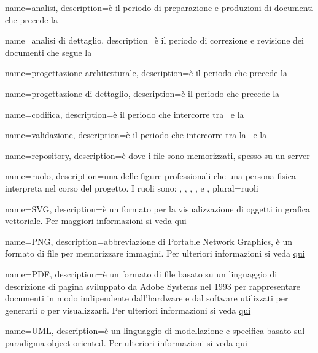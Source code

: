  {
	name=analisi,
	description={è il periodo di preparazione e produzioni di documenti che precede la \RR}
}

 {
	name=analisi di dettaglio,
	description={è il periodo di correzione e revisione dei documenti che segue la \RR{}}
}

 {
	name=progettazione architetturale,
	description={è il periodo che precede la \RP}
}

 {
	name=progettazione di dettaglio,
	description={è il periodo che precede la \RP}
}

 {
	name=codifica,
	description={è il periodo che intercorre tra \RP\ e la \RQ}
}

 {
	name=validazione,
	description={è il periodo che intercorre tra la \RQ\ e la \RA}
}

 {
	name=repository,
	description={è dove i file sono memorizzati, spesso su un server}
}

 {
	name=ruolo,
	description={una delle figure professionali che una persona fisica interpreta nel corso del progetto. I ruoli sono: , , , ,  e },
    plural=ruoli
}

 {
	name=SVG,
	description={è un formato per la visualizzazione di oggetti in grafica vettoriale. Per maggiori informazioni si veda \href{https://it.wikipedia.org/wiki/Scalable_Vector_Graphics}{qui}}
}

 {
	name=PNG,
	description={abbreviazione di Portable Network Graphics, è un formato di file per memorizzare immagini. Per ulteriori informazioni si veda \href{http://it.wikipedia.org/wiki/Portable_Network_Graphics}{qui}}
}

 {
	name=PDF,
	description={è un formato di file basato su un linguaggio di descrizione di pagina sviluppato da Adobe Systems nel 1993 per rappresentare documenti in modo indipendente dall’hardware e dal software utilizzati per generarli o per visualizzarli. Per ulteriori informazioni si veda \href{http://it.wikipedia.org/wiki/Portable_Document_Format}{qui}}
}

 {
	name=UML,
	description={è un linguaggio di modellazione e specifica basato sul paradigma object-oriented. Per ulteriori informazioni si veda \href{http://it.wikipedia.org/wiki/Unified_Modeling_Language}{qui}}
}

